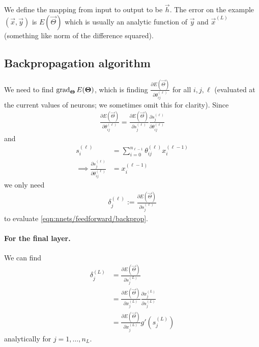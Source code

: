 We define the mapping from input to output to be $\vec h$. The error on the example $(\vec x, \vec y)$ is $E(\vec \Theta)$ which is usually an analytic function of $\vec y$ and $\vec x^{(L)}$ (something like norm of the difference squared).

\subsection{Backpropagation algorithm}
We need to find $\operatorname{\mathrm{grad}}_{\boldsymbol{\mathbf{\Theta}}} E(\boldsymbol{\mathbf{\Theta}})$, which is finding $\frac{\partial E(\vec \Theta)}{\partial \theta_{ij}^{(\ell)}}$ for all $i, j, \ell$ (evaluated at the current values of neurons; we sometimes omit this for clarity). Since
\begin{align}
    \frac{\partial E(\vec \Theta)}{\partial \theta_{ij}^{(\ell)}} = \frac{\partial E(\vec \Theta)}{\partial s_j^{(\ell)}} \frac{\partial s_j^{(\ell)}}{\partial \theta_{ij}^{(\ell)}} \label{eqn:nnets/feedforward/backprop}
\end{align}
and
\begin{align}
                s_i^{(\ell)}                                                &= \sum_{i = 0}^{n_{\ell - 1}} \theta_{ij}^{(\ell)} x_i^{(\ell - 1)} \\
    \implies    \frac{\partial s_j^{(\ell)}}{\partial \theta_{ij}^{(\ell)}} &= x_i^{(\ell - 1)}
\end{align}
we only need
\begin{align}
    \delta_j^{(\ell)} := \frac{\partial E(\vec \Theta)}{\partial s_j^{(\ell)}}
\end{align}
to evaluate \eqref{eqn:nnets/feedforward/backprop}.

\paragraph{For the final layer.} We can find
\begin{align}
    \delta_j^{(L)}  &= \frac{\partial E(\vec \Theta)}{\partial s_j^{(L)}} \\
                    &= \frac{\partial E(\vec \Theta)}{\partial x_j^{(L)}} \frac{\partial x_j^{(L)}}{\partial s_j^{(L)}} \\
                    &= \frac{\partial E(\vec \Theta)}{\partial x_j^{(L)}} g'\left(s_j^{(L)}\right) \label{eqn:nnets/feedforward/delta-last}
\end{align}
analytically for $j = 1, \dotsc, n_L$.

